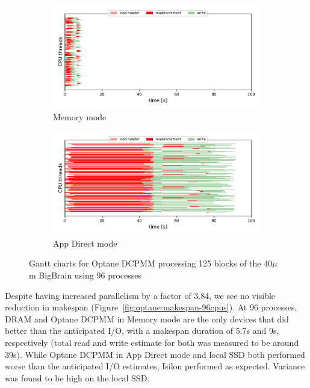 \begin{figure}
    \begin{subfigure}{0.5\textwidth}
        \centering
    \includegraphics[width=\columnwidth]{figures/optane/gantt-1572306855-tmpfs_1it_96cpus_40bb-2.pdf}
    \caption{Memory mode}
\end{subfigure}
\begin{subfigure}{0.5\textwidth}
        \centering
    \includegraphics[width=\columnwidth]{figures/optane/gantt-1572379747-optaneAD_1it_96cpus_40bb-1.pdf}
    \caption{App Direct mode}
\end{subfigure}
    \captionsetup{belowskip=-10pt}
\caption{Gantt charts for Optane DCPMM processing 125 blocks of the 40$\mu$m
BigBrain using 96 processes}\label{fig:optane:gantt96}
\end{figure}

Despite having increased parallelism by a factor of 3.84, we see no visible
reduction in makespan (Figure~\ref{fig:optane:makespan-96cpus}). At 96 processes, DRAM
and Optane DCPMM in Memory mode are the only devices that did better than the
anticipated I/O, with a makespan duration of 5.7s and 9s, respectively (total
read and write estimate for both was measured to be around 39s). While Optane
DCPMM in App Direct mode and local SSD both performed worse than the anticipated
I/O estimates, Isilon performed as expected. Variance was found to be high on
the local SSD.

